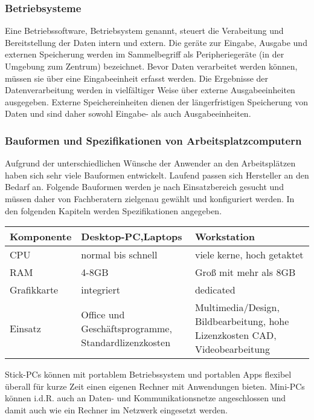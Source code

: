 \documentclass[a4paper, 12pt]{report}
\begin{document}
\subsubsection{Betriebsysteme}

Eine Betriebssoftware, Betriebsystem genannt, steuert die Verabeitung und
Bereitstellung der Daten intern und extern. Die geräte zur Eingabe, Ausgabe und
externen Speicherung werden im Sammelbegriff als Peripheriegeräte (in der
Umgebung zum Zentrum) bezeichnet. Bevor Daten verarbeitet werden können, müssen
sie über eine Eingabeeinheit erfasst werden. Die Ergebnisse der
Datenverarbeitung werden in vielfältiger Weise über externe Ausgabeeinheiten
ausgegeben. Externe Speichereinheiten dienen der längerfristigen Speicherung von
Daten und sind daher sowohl Eingabe- als auch Ausgabeeinheiten.

\subsubsection{Bauformen und Spezifikationen von Arbeitsplatzcomputern}

Aufgrund der unterschiedlichen Wünsche der Anwender an den Arbeitsplätzen haben
sich sehr viele Bauformen entwickelt. Laufend passen sich Hersteller an den
Bedarf an. Folgende Bauformen werden je nach Einsatzbereich gesucht und müssen
daher von Fachberatern zielgenau gewählt und konfiguriert werden. In den
folgenden Kapiteln werden Spezifikationen angegeben.

\begin{tabular}{ | l | p{6cm} | p{6cm} | }
    \hline
    Komponente & Desktop-PC,Laptops & Workstation \\ \hline
    CPU & normal bis schnell & viele kerne, hoch getaktet \\ \hline
    RAM & 4-8GB & Groß mit mehr als 8GB \\ \hline
    Grafikkarte & integriert & dedicated \\ \hline
    Einsatz & Office und Geschäftsprogramme, \newline Standardlizenzkosten &
    Multimedia/Design, Bildbearbeitung, \newline hohe Lizenzkosten CAD,
    Videobearbeitung \\
    \hline
\end{tabular}

\newpage
Stick-PCs können mit portablem Betriebssystem und portablen Apps flexibel
überall für kurze Zeit einen eigenen Rechner mit Anwendungen bieten. Mini-PCs
können i.d.R. auch an Daten- und Kommunikationsnetze angeschlossen und damit
auch wie ein Rechner im Netzwerk eingesetzt werden. \\
\end{document}

